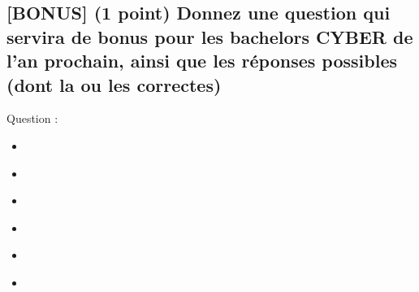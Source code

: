 \documentclass[11pt,a4paper]{article}
\begin{document}
\vspace*{0.5cm}


\subsection{[BONUS] (1 point) Donnez une question qui servira de bonus pour les bachelors CYBER de l'an prochain, ainsi que les réponses possibles (dont la ou les correctes) }

Question :

\bigskip
\bigskip
\bigskip
\bigskip
\bigskip
\bigskip
\bigskip

\begin{itemize}
  \item[\CaseCoche] \phantom{()} \\
  \item[\CaseCoche] \phantom{()} \\
  \item[\CaseCoche] \phantom{()} \\
  \item[\CaseCoche] \phantom{()} \\
  \item[\CaseCoche] \phantom{()} \\
  \item[\CaseCoche] \phantom{()} \\
\end{itemize}

\vfillLast
\end{document}
